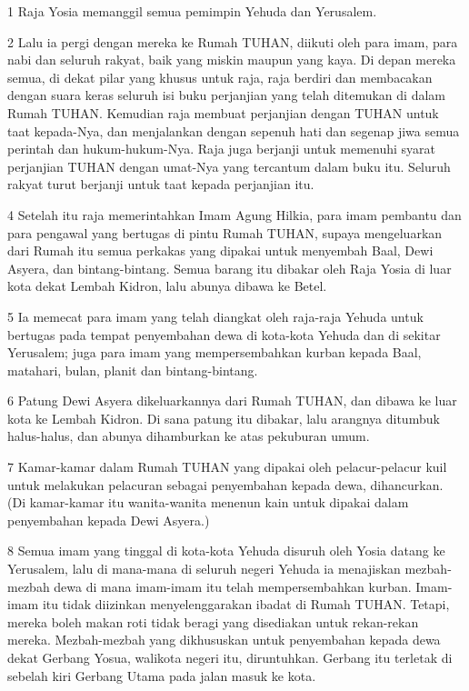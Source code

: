\par 1 Raja Yosia memanggil semua pemimpin Yehuda dan Yerusalem.
\par 2 Lalu ia pergi dengan mereka ke Rumah TUHAN, diikuti oleh para imam, para nabi dan seluruh rakyat, baik yang miskin maupun yang kaya. Di depan mereka semua, di dekat pilar yang khusus untuk raja, raja berdiri dan membacakan dengan suara keras seluruh isi buku perjanjian yang telah ditemukan di dalam Rumah TUHAN. Kemudian raja membuat perjanjian dengan TUHAN untuk taat kepada-Nya, dan menjalankan dengan sepenuh hati dan segenap jiwa semua perintah dan hukum-hukum-Nya. Raja juga berjanji untuk memenuhi syarat perjanjian TUHAN dengan umat-Nya yang tercantum dalam buku itu. Seluruh rakyat turut berjanji untuk taat kepada perjanjian itu.
\par 4 Setelah itu raja memerintahkan Imam Agung Hilkia, para imam pembantu dan para pengawal yang bertugas di pintu Rumah TUHAN, supaya mengeluarkan dari Rumah itu semua perkakas yang dipakai untuk menyembah Baal, Dewi Asyera, dan bintang-bintang. Semua barang itu dibakar oleh Raja Yosia di luar kota dekat Lembah Kidron, lalu abunya dibawa ke Betel.
\par 5 Ia memecat para imam yang telah diangkat oleh raja-raja Yehuda untuk bertugas pada tempat penyembahan dewa di kota-kota Yehuda dan di sekitar Yerusalem; juga para imam yang mempersembahkan kurban kepada Baal, matahari, bulan, planit dan bintang-bintang.
\par 6 Patung Dewi Asyera dikeluarkannya dari Rumah TUHAN, dan dibawa ke luar kota ke Lembah Kidron. Di sana patung itu dibakar, lalu arangnya ditumbuk halus-halus, dan abunya dihamburkan ke atas pekuburan umum.
\par 7 Kamar-kamar dalam Rumah TUHAN yang dipakai oleh pelacur-pelacur kuil untuk melakukan pelacuran sebagai penyembahan kepada dewa, dihancurkan. (Di kamar-kamar itu wanita-wanita menenun kain untuk dipakai dalam penyembahan kepada Dewi Asyera.)
\par 8 Semua imam yang tinggal di kota-kota Yehuda disuruh oleh Yosia datang ke Yerusalem, lalu di mana-mana di seluruh negeri Yehuda ia menajiskan mezbah-mezbah dewa di mana imam-imam itu telah mempersembahkan kurban. Imam-imam itu tidak diizinkan menyelenggarakan ibadat di Rumah TUHAN. Tetapi, mereka boleh makan roti tidak beragi yang disediakan untuk rekan-rekan mereka. Mezbah-mezbah yang dikhususkan untuk penyembahan kepada dewa dekat Gerbang Yosua, walikota negeri itu, diruntuhkan. Gerbang itu terletak di sebelah kiri Gerbang Utama pada jalan masuk ke kota.
